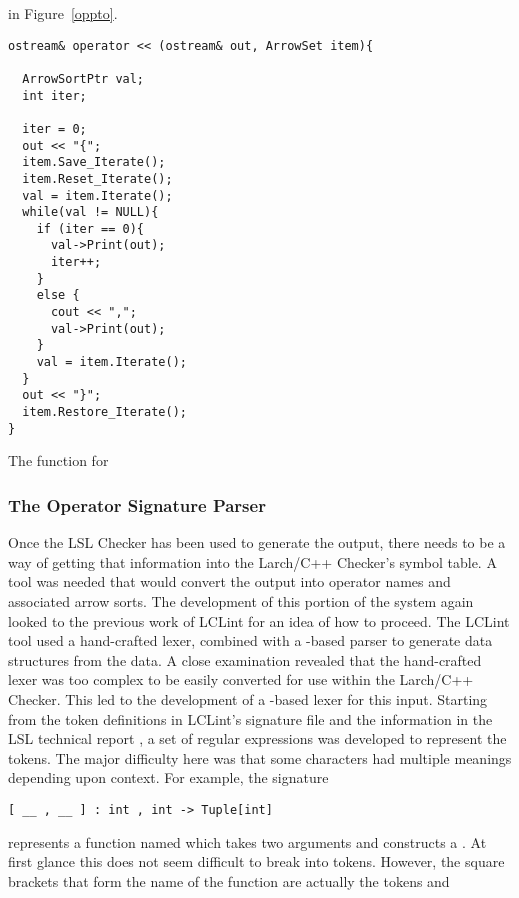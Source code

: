 in Figure~\ref{oppto}.
\begin{BFIGURE}
\begin{verbatim}
ostream& operator << (ostream& out, ArrowSet item){
  
  ArrowSortPtr val;
  int iter;

  iter = 0;
  out << "{";
  item.Save_Iterate();
  item.Reset_Iterate();
  val = item.Iterate();
  while(val != NULL){
    if (iter == 0){
      val->Print(out);
      iter++;
    }
    else {
      cout << ",";
      val->Print(out);
    }
    val = item.Iterate();
  }
  out << "}";
  item.Restore_Iterate();
}
\end{verbatim}
\caption{The  function for }
\label{oppto}
\end{BFIGURE}

\subsubsection{The Operator Signature Parser}
Once the LSL Checker has been used to generate the 
output, there needs to be a way of getting that information into the
Larch/C++ Checker's symbol table. A tool was needed that would convert
the  output into operator names and associated arrow
sorts. The development of this portion of the system again looked to
the previous work of LCLint for an idea of how to proceed. The LCLint
tool used a hand-crafted lexer, combined with a -based
parser to generate data structures from the
 data. A close examination revealed that the
hand-crafted lexer was too complex to be easily converted for use
within the Larch/C++ Checker. This led to the development of a
-based lexer for this input. Starting from the token
definitions in LCLint's signature file and the information in the LSL
technical report \cite{Guttag-Horning-Modet90}, a set of regular
expressions was developed to represent the tokens. The major
difficulty here was that some characters had multiple meanings
depending upon context. For example, the signature
\begin{verbatim}
[ __ , __ ] : int , int -> Tuple[int]
\end{verbatim} 
represents a function named \reserved{[]} which takes two
 arguments and constructs a . At
first glance this does not seem difficult to break into
tokens. However, the square brackets that form the name of the
function are actually the tokens  and
